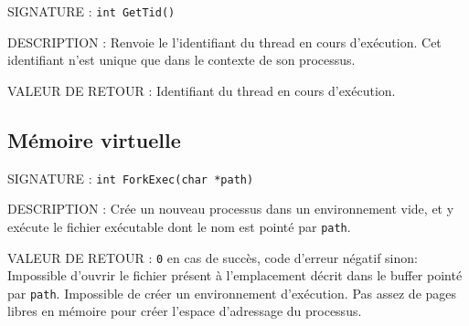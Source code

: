 \documentclass{article}
\begin{document}
		\vspace{2.5mm}
		\begin{description}
			\item{SIGNATURE : } \texttt{int GetTid()}
			\item{DESCRIPTION : Renvoie le l'identifiant du thread en cours d'exécution. Cet identifiant n'est unique que dans le contexte de son processus.} 
			\item{VALEUR DE RETOUR : } Identifiant du thread en cours d'exécution.
		\end{description}
	\subsection{Mémoire virtuelle}
		\begin{description}
			\item{SIGNATURE : } \texttt{int ForkExec(char *path)}
			\item{DESCRIPTION : } Crée un nouveau processus dans un environnement vide, et y exécute le fichier exécutable dont le nom est pointé par \texttt{path}.
			\item{VALEUR DE RETOUR : } \texttt{0} en cas de succès, code d'erreur négatif sinon:
				 Impossible d'ouvrir le fichier présent à l'emplacement décrit dans le buffer pointé par \texttt{path}.
				 Impossible de créer un environnement d'exécution.
				 Pas assez de pages libres en mémoire pour créer l'espace d'adressage du processus.
		\end{description}
		
\end{document}
